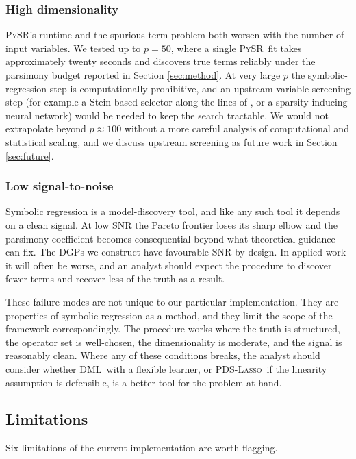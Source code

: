 \documentclass[11pt, a4paper]{article}
\theoremstyle{plain}
\theoremstyle{definition}
\theoremstyle{remark}
\newcommand{\lasso}{\textsc{Lasso}}
\newcommand{\pds}{\textsc{PDS}}
\newcommand{\dml}{\textsc{DML}}
\newcommand{\pysr}{\textsc{PySR}}
\begin{document}
\subsubsection{High dimensionality}

\pysr's runtime and the spurious-term problem both worsen with
the number of input variables. We tested up to $p=50$, where a
single \pysr\ fit takes approximately twenty seconds and
discovers true terms reliably under the parsimony budget reported
in Section \ref{sec:method}. At very large $p$ the symbolic-%
regression step is computationally prohibitive, and an upstream
variable-screening step (for example a Stein-based selector along
the lines of \citealp{duetal2025}, or a sparsity-inducing
neural network) would be needed to keep the search tractable.
We would not extrapolate beyond $p \approx 100$ without a more
careful analysis of computational and statistical scaling, and
we discuss upstream screening as future work in Section
\ref{sec:future}.

\subsubsection{Low signal-to-noise}

Symbolic regression is a
model-discovery tool, and like any such tool it depends on a
clean signal. At low SNR the Pareto frontier loses its sharp
elbow and the parsimony coefficient becomes consequential
beyond what theoretical guidance can fix. The DGPs we
construct have favourable SNR by design. In applied work it
will often be worse, and an analyst should expect the
procedure to discover fewer terms and recover less of the
truth as a result.

These failure modes are not unique to our particular
implementation. They are properties of symbolic regression as a
method, and they limit the scope of the framework
correspondingly. The procedure works where the truth is
structured, the operator set is well-chosen, the dimensionality
is moderate, and the signal is reasonably clean. Where any of
these conditions breaks, the analyst should consider whether
\dml\ with a flexible learner, or \pds-\lasso\ if the linearity
assumption is defensible, is a better tool for the problem at
hand.

\subsection{Limitations}

Six limitations of the current implementation are worth
flagging.
\end{document}
